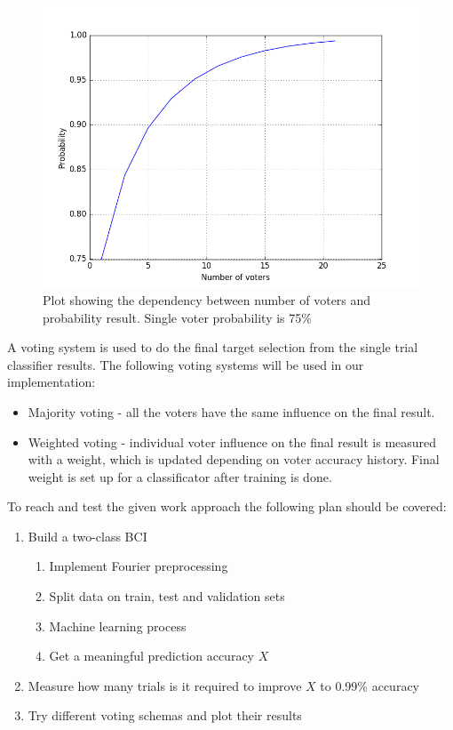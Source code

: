 \documentclass[12pt]{article}
\begin{document}
\begin{figure} [H]
\begin{center}
\includegraphics[width=1\textwidth]{condorcet}
\caption{Plot showing the dependency between number of voters and probability result. Single voter probability is 75\%}
\label{fig:condorcet}
\end{center}
\end{figure}

A voting system is used to do the final target selection from the single trial classifier results. The following voting systems will be used in our implementation:
\begin{itemize}
\item Majority voting - all the voters have the same influence on the final result.
\item Weighted voting - individual voter influence on the final result is measured with a weight, which is updated depending on voter accuracy history. Final weight is set up for a classificator after training is done.
\end{itemize}

To reach and test the given work approach the following plan should be covered:
\begin{enumerate}
\item Build a two-class BCI 
\begin{enumerate}
\item Implement Fourier preprocessing
\item Split data on train, test and validation sets
\item Machine learning process
\item Get a meaningful prediction accuracy $X$
\end{enumerate}
\item Measure how many trials is it required to improve $X$ to 0.99\% accuracy
\item Try different voting schemas and plot their results
\end{enumerate}
\end{document}
